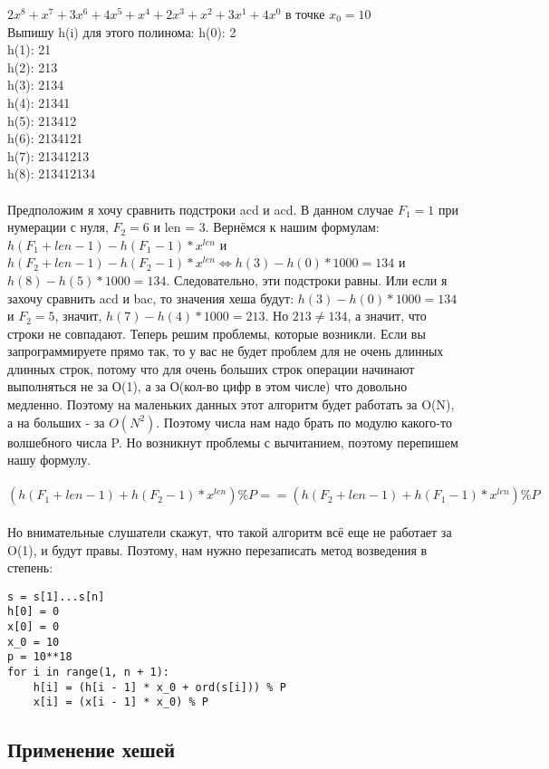 \documentclass[a4paper,12pt]{article}
\begin{document}
$2x^8 + x^7 + 3x^6 + 4x^5 + x^4 + 2x^3 + x^2 + 3x^1 + 4x^0$ в точке $x_0 = 10$\\
Выпишу h(i) для этого полинома:
h(0): 2\\
h(1): 21\\
h(2): 213\\
h(3): 2134\\
h(4): 21341\\
h(5): 213412\\
h(6): 2134121\\
h(7): 21341213\\
h(8): 213412134\\ \\
Предположим я хочу сравнить подстроки acd и acd. В данном случае $F_1 = 1$ при нумерации с нуля, $F_2 = 6$ и len = 3. Вернёмся к нашим формулам: $h(F_{1} + len - 1) - h(F_{1} - 1) * x^{len}$ и $h(F_{2} + len - 1) - h(F_{2} - 1) * x^{len} \Longleftrightarrow h(3) - h(0) * 1000 = 134$ и $h(8) - h(5) * 1000 = 134$. Следовательно, эти подстроки равны. Или если я захочу сравнить acd и bac, то значения хеша будут: $h(3) - h(0) * 1000 = 134$ и $F_2 = 5$, значит, $h(7) - h(4) * 1000 = 213$. Но $213 \neq 134$, а значит, что строки не совпадают. Теперь решим проблемы, которые возникли. Если вы запрограммируете прямо так, то у вас не будет проблем для не очень длинных длинных строк, потому что для очень больших строк операции начинают выполняться не за О(1), а за О(кол-во цифр в этом числе) что довольно медленно. Поэтому на маленьких данных этот алгоритм будет работать за O(N), а на больших - за $O(N^2)$. Поэтому числа нам надо брать по модулю какого-то волшебного числа P. Но возникнут проблемы с вычитанием, поэтому перепишем нашу формулу. \\ \\
$(h(F_{1} + len - 1) + h(F_{2} - 1) * x^{len}) \% P == (h(F_{2} + len - 1) + h(F_{1} - 1) * x^{len}) \% P$\\ \\
Но внимательные слушатели скажут, что такой алгоритм всё еще не работает за O(1), и будут правы. Поэтому, нам нужно перезаписать метод возведения в степень:
\begin{verbatim}
s = s[1]...s[n]
h[0] = 0
x[0] = 0
x_0 = 10
p = 10**18
for i in range(1, n + 1):
    h[i] = (h[i - 1] * x_0 + ord(s[i])) % P
    x[i] = (x[i - 1] * x_0) % P
\end{verbatim}
\subsection{Применение хешей}
\end{document}
